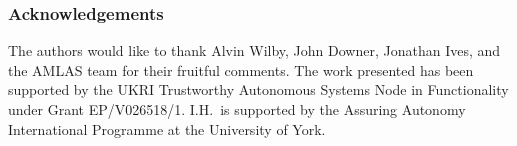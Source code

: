 \documentclass[runningheads]{llncs}
\begin{document}
\subsubsection{Acknowledgements} The authors would like to thank Alvin Wilby, John Downer, Jonathan Ives, and the AMLAS team for their fruitful comments. The work presented has been supported by the UKRI Trustworthy Autonomous Systems Node in Functionality under Grant EP/V026518/1. I.H.\ is supported by the Assuring Autonomy International Programme at the University of York.
%
%
%


\end{document}
